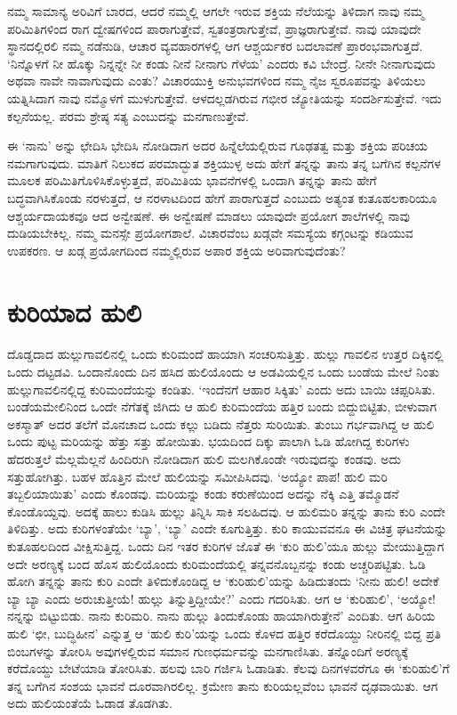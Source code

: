 ನಮ್ಮ ಸಾಮಾನ್ಯ ಅರಿವಿಗೆ ಬಾರದ, ಆದರೆ ನಮ್ಮಲ್ಲಿ ಆಗಲೇ ಇರುವ ಶಕ್ತಿಯ ನೆಲೆಯನ್ನು ತಿಳಿದಾಗ ನಾವು ನಮ್ಮ ಪರಿಮಿತಿಗಳಿಂದ ರಾಗ ದ್ವೇಷಗಳಿಂದ ಪಾರಾಗುತ್ತೇವೆ, ಸ್ವತಂತ್ರರಾಗು\-ತ್ತೇವೆ, ಪ್ರಾಜ್ಞರಾಗುತ್ತೇವೆ. ನಾವು ಯಾವುದೇ ಸ್ಥಾನದಲ್ಲಿರಲಿ ನಮ್ಮ ನಡೆನುಡಿ, ಆಚಾರ ವ್ಯವಹಾರಗಳಲ್ಲಿ ಆಗ ಆಶ್ಚರ್ಯಕರ ಬದಲಾವಣೆ ಪ್ರಾರಂಭವಾಗುತ್ತದೆ. ‘ನಿನ್ನೊಳಗೆ ನೀ ಹೊಕ್ಕು ನಿನ್ನನ್ನೇ ನೀ ಕಂಡು ನೀನೆ ನೀನಾಗು ಗೆಳೆಯ’ ಎಂದರು ಕವಿ ಬೇಂದ್ರೆ. ನೀನೇ ನೀನಾಗುವುದು ಅಥವಾ ನಾವೇ ನಾವಾಗು\-ವುದು ಎಂತು? ವಿಚಾರಯುಕ್ತಿ ಅನುಭವಗಳಿಂದ ನಮ್ಮ ನೈಜ ಸ್ವರೂಪವನ್ನು ತಿಳಿಯಲು ಯತ್ನಿಸಿದಾಗ ನಾವು ನಮ್ಮೊಳಗೆ ಮುಳುಗುತ್ತೇವೆ. ಆಳದಲ್ಲಡಗಿರುವ ಗಭೀರ ಜ್ಯೋತಿಯನ್ನು ಸಂದರ್ಶಿಸುತ್ತೇವೆ. ಇದು ಕಲ್ಪನೆಯಲ್ಲ. ಪರಮ ಶ್ರೇಷ್ಠ ಸತ್ಯ ಎಂಬುದನ್ನು ಮನಗಾಣುತ್ತೇವೆ.

ಈ ‘ನಾನು’ ಅನ್ನು ಛೇದಿಸಿ ಭೇದಿಸಿ ನೋಡಿದಾಗ ಅದರ ಹಿನ್ನೆಲೆಯಲ್ಲಿರುವ ಗೂಢತತ್ವ ಮತ್ತು ಶಕ್ತಿಯ ಪರಿಚಯ ನಮಗಾಗುವುದು. ಮಾತಿಗೆ ನಿಲುಕದ ಪರಮಾದ್ಭುತ ಶಕ್ತಿಯುಳ್ಳ ಅದು ಹೇಗೆ ತನ್ನನ್ನು ತಾನು ತನ್ನ ಬಗೆಗಿನ ಕಲ್ಪನೆಗಳ ಮೂಲಕ ಪರಿಮಿತಿಗೊಳಿಸಿಕೊಳ್ಳುತ್ತದೆ, ಪರಿಮಿತಿಯ ಭಾವನೆಗಳಲ್ಲಿ ಒಂದಾಗಿ ತನ್ನನ್ನು ತಾನು ಹೇಗೆ ಬದ್ಧವಾಗಿಸಿಕೊಂಡು ನರಳುತ್ತದೆ, ಆ ನರಳಾಟದಿಂದ ಹೇಗೆ ಪಾರಾಗುತ್ತದೆ ಎಂಬುದು ಅತ್ಯಂತ ಕುತೂಹಲಕಾರಿಯೂ ಆಶ್ಚರ್ಯದಾಯಕವೂ ಆದ ಅನ್ವೇಷಣೆ. ಈ ಅನ್ವೇಷಣೆ ಮಾಡಲು ಯಾವುದೇ ಪ್ರಯೋಗ ಶಾಲೆಗಳಲ್ಲಿ ನಾವು ದುಡಿಯಬೇಕಿಲ್ಲ. ನಮ್ಮ ಮನಸ್ಸೇ ಪ್ರಯೋಗಶಾಲೆ. ವಿಚಾರವೆಂಬ ಖಡ್ಗವೇ ಸಮಸ್ಯೆಯ ಕಗ್ಗಂಟನ್ನು ಕಡಿಯುವ ಉಪಕರಣ. ಆ ಖಡ್ಗ ಪ್ರಯೋಗದಿಂದ ನಮ್ಮಲ್ಲಿರುವ ಅಪಾರ ಶಕ್ತಿಯ ಅರಿವಾಗುವುದೆಂತು?


\section*{ಕುರಿಯಾದ ಹುಲಿ}


ದೊಡ್ಡದಾದ ಹುಲ್ಲುಗಾವಲಿನಲ್ಲಿ ಒಂದು ಕುರಿಮಂದೆ ಹಾಯಾಗಿ ಸಂಚರಿಸುತ್ತಿತ್ತು. ಹುಲ್ಲು ಗಾವಲಿನ ಉತ್ತರ ದಿಕ್ಕಿನಲ್ಲಿ ಒಂದು ದಟ್ಟಡವಿ. ಒಂದಾನೊಂದು ದಿನ ಹಸಿದ ಹುಲಿಯೊಂದು ಆ ಅಡವಿಯಲ್ಲಿನ ಒಂದು ಬಂಡೆಯ ಮೇಲೆ ನಿಂತು ಹುಲ್ಲುಗಾವಲಿನಲ್ಲಿದ್ದ ಕುರಿಮಂದೆಯನ್ನು ಕಂಡಿತು. ‘ಇಂದೆನಗೆ ಆಹಾರ ಸಿಕ್ಕಿತು’ ಎಂದು ಅದು ಬಾಯಿ ಚಪ್ಪರಿಸಿತು. ಬಂಡೆಯ\break ಮೇಲಿನಿಂದ ಒಂದೇ ನೆಗೆತಕ್ಕೆ ಜಿಗಿದು ಆ ಹುಲಿ ಕುರಿಮಂದೆಯ ಹತ್ತಿರ ಬಂದು ಬಿದ್ದುಬಿಟ್ಟಿತು, ಬೀಳುವಾಗ ಅಕಸ್ಮಾತ್ ಅದರ ತಲೆಗೆ ಮೊನಚಾದ ಒಂದು ಕಲ್ಲು ಬಡಿದು ನೆತ್ತರು ಸುರಿಯಿತು. ತುಂಬು ಗರ್ಭವಾಗಿದ್ದ ಆ ಹುಲಿ ಒಂದು ಪುಟ್ಟ ಮರಿಯನ್ನು ಹೆತ್ತು ಸತ್ತು ಹೋಯಿತು. ಭಯದಿಂದ ದಿಕ್ಕು ಪಾಲಾಗಿ ಓಡಿ ಹೋಗಿದ್ದ ಕುರಿಗಳು ಹೆದರುತ್ತಲೆ ಮೆಲ್ಲಮೆಲ್ಲನೆ ಹಿಂದಿರುಗಿ ನೋಡಿದಾಗ ಹುಲಿ ಮಲಗಿಕೊಂಡೇ ಇರುವುದನ್ನು ಕಂಡವು. ಅದು ಸತ್ತುಹೋಗಿತ್ತು. ಬಹಳ ಹೊತ್ತಿನ ಮೇಲೆ ಹುಲಿಯನ್ನು ಸಮೀಪಿಸಿದವು. ‘ಅಯ್ಯೋ ಪಾಪ! ಹುಲಿ ಮರಿ ತಬ್ಬಲಿಯಾಯಿತು’ ಎಂದು ಕೊಂಡವು. ಮರಿಯನ್ನು ಕಂಡು ಕರುಣೆಯಿಂದ ಅದನ್ನು ನೆಕ್ಕಿ ಎತ್ತಿ ತಮ್ಮೊಡನೆ ಕೊಂಡೊಯ್ದವು. ಅದಕ್ಕೆ ಹಾಲು ಕುಡಿಸಿ ಹುಲ್ಲು ತಿನ್ನಿಸಿ ಸಾಕಿ ಸಲಹಿದವು. ಆ ಹುಲಿಮರಿ ತನ್ನನ್ನು ತಾನು ಕುರಿ ಎಂದೇ ತಿಳಿದಿತ್ತು. ಅದು ಕುರಿಗಳಂತೆಯೇ ‘ಬ್ಯಾ’, ‘ಬ್ಯಾ’ ಎಂದೇ ಕೂಗುತ್ತಿತ್ತು. ಕುರಿ ಕಾಯುವವನೂ ಈ ವಿಚಿತ್ರ ಘಟನೆಯನ್ನು ಕುತೂಹಲದಿಂದ ವೀಕ್ಷಿಸುತ್ತಿದ್ದ. ಒಂದು ದಿನ ಇತರ ಕುರಿಗಳ ಜೊತೆ ಈ ‘ಕುರಿ ಹುಲಿ’ಯೂ ಹುಲ್ಲು ಮೇಯುತ್ತಿದ್ದಾಗ ಅದೇ ಅರಣ್ಯಕ್ಕೆ ಬಂದ ಹೊಸ ಹುಲಿಯೊಂದು ಕುರಿಮಂದೆಯಲ್ಲಿ ತನ್ನವನೊಬ್ಬನನ್ನು ಕಂಡು ಅಚ್ಚರಿಪಟ್ಟಿತು. ಓಡಿ ಹೋಗಿ ತನ್ನನ್ನು ತಾನು ಕುರಿ ಎಂದೇ ತಿಳಿದುಕೊಂಡಿದ್ದ ಆ ‘ಕುರಿಹುಲಿ’ಯನ್ನು ಹಿಡಿದುತಂದು ‘ನೀನು ಹುಲಿ! ಅದೇಕೆ ಬ್ಯಾ ಬ್ಯಾ ಎಂದು ಅರುಚುತ್ತೀಯೆ! ಹುಲ್ಲು ತಿನ್ನುತ್ತಿದ್ದೀಯೇ?’ ಎಂದು ಗದರಿಸಿತು. ಆಗ ಆ ‘ಕುರಿಹುಲಿ’, ‘ಅಯ್ಯೋ! ನನ್ನನ್ನು ಬಿಟ್ಟುಬಿಡು. ನಾನು ಕುರಿಮರಿ. ನಾನು ಹುಲ್ಲು ತಿಂದುಕೊಂಡು ಹಾಯಾಗಿರುತ್ತೇನೆ’ ಎಂದಿತು. ಆಗ ಹಿರಿಯ ಹುಲಿ ‘ಛೀ, ಬುದ್ಧಿಹೀನ’ ಎನ್ನುತ್ತ ಆ ‘ಹುಲಿ ಕುರಿ’ಯನ್ನು ಒಂದು ಕೊಳದ ಹತ್ತಿರ ಕರೆದೊಯ್ದು ನೀರಿನಲ್ಲಿ ಬಿದ್ದ ಪ್ರತಿ ಬಿಂಬಗಳನ್ನು ತೋರಿಸಿ ಅವುಗಳಲ್ಲಿರುವ ಸಮಾನ ಗುಣಧರ್ಮವನ್ನು ಮನಗಾಣಿಸಿತು. ತನ್ನೊಂದಿಗೆ ಅರಣ್ಯಕ್ಕೆ ಕರೆದೊಯ್ದು ಬೇಟೆಯಾಡಿ ತೋರಿಸಿತು. ಹಲವು ಬಾರಿ ಗರ್ಜಿಸಿ ಓಡಾಡಿತು. ಕೆಲವು ದಿನಗಳವರೆಗೂ ಈ ‘ಕುರಿಹುಲಿ’ಗೆ ತನ್ನ ಬಗೆಗಿನ ಸಂಶಯ ಭಾವನೆ ದೂರವಾಗಿರಲಿಲ್ಲ. ಕ್ರಮೇಣ ತಾನು ಕುರಿಯಲ್ಲವೆಂಬ ಭಾವನೆ ದೃಢವಾಯಿತು. ಆಗ ಅದು ಹುಲಿಯಂತೆಯೆ ಓಡಾಡ ತೊಡಗಿತು.


